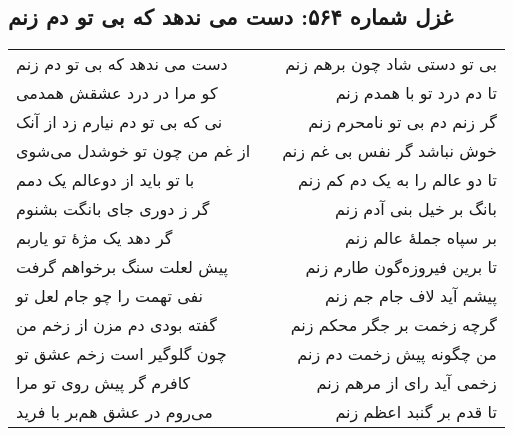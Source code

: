 \begin{center}
\section*{غزل شماره ۵۶۴: دست می ندهد که بی تو دم زنم}
\label{sec:564}
\begin{longtable}{l p{0.5cm} r}
دست می ندهد که بی تو دم زنم
&&
بی تو دستی شاد چون برهم زنم
\\
کو مرا در درد عشقش همدمی
&&
تا دم درد تو با همدم زنم
\\
نی که بی تو دم نیارم زد از آنک
&&
گر زنم دم بی تو نامحرم زنم
\\
از غم من چون تو خوشدل می‌شوی
&&
خوش نباشد گر نفس بی غم زنم
\\
با تو باید از دوعالم یک دمم
&&
تا دو عالم را به یک دم کم زنم
\\
گر ز دوری جای بانگت بشنوم
&&
بانگ بر خیل بنی آدم زنم
\\
گر دهد یک مژهٔ تو یاربم
&&
بر سپاه جملهٔ عالم زنم
\\
پیش لعلت سنگ برخواهم گرفت
&&
تا برین فیروزه‌گون طارم زنم
\\
نفی تهمت را چو جام لعل تو
&&
پیشم آید لاف جام جم زنم
\\
گفته بودی دم مزن از زخم من
&&
گرچه زخمت بر جگر محکم زنم
\\
چون گلوگیر است زخم عشق تو
&&
من چگونه پیش زخمت دم زنم
\\
کافرم گر پیش روی تو مرا
&&
زخمی آید رای از مرهم زنم
\\
می‌روم در عشق هم‌بر با فرید
&&
تا قدم بر گنبد اعظم زنم
\\
\end{longtable}
\end{center}
